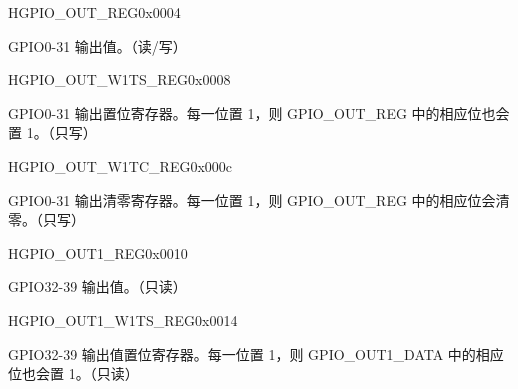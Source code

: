 \begin{register}{H}{GPIO\_OUT\_REG}{0x0004}\label{regdesc:GPIOOUTREG}
%
\regnewline%
\begin{regdesc}\begin{reglist}
\item [GPIO\_OUT\_REG]GPIO0-31 输出值。（读/写）
\end{reglist}\end{regdesc}
\end{register}


\begin{register}{H}{GPIO\_OUT\_W1TS\_REG}{0x0008}\label{regdesc:GPIOOUTW1TSREG}
%
\regnewline%
\begin{regdesc}\begin{reglist}
\item [GPIO\_OUT\_W1TS\_REG]GPIO0-31 输出置位寄存器。每一位置 1，则 GPIO\_OUT\_REG 中的相应位也会置 1。（只写）
\end{reglist}\end{regdesc}
\end{register}


\begin{register}{H}{GPIO\_OUT\_W1TC\_REG}{0x000c}\label{regdesc:GPIOOUTW1TCREG}
%
\regnewline%
\begin{regdesc}\begin{reglist}
\item [GPIO\_OUT\_W1TC\_REG]GPIO0-31 输出清零寄存器。每一位置 1，则 GPIO\_OUT\_REG 中的相应位会清零。（只写）
\end{reglist}\end{regdesc}
\end{register}


\begin{register}{H}{GPIO\_OUT1\_REG}{0x0010}\label{regdesc:GPIOOUT1REG}
%
%
\regnewline%
\begin{regdesc}\begin{reglist}
\item [GPIO\_OUT\_DATA]GPIO32-39 输出值。（只读）
\end{reglist}\end{regdesc}
\end{register}


\begin{register}{H}{GPIO\_OUT1\_W1TS\_REG}{0x0014}\label{regdesc:GPIOOUT1W1TSREG}
%
%
\regnewline%
\begin{regdesc}\begin{reglist}
\item [GPIO\_OUT\_DATA]GPIO32-39 输出值置位寄存器。每一位置 1，则 GPIO\_OUT1\_DATA 中的相应位也会置 1。（只读）
\end{reglist}\end{regdesc}
\end{register}



